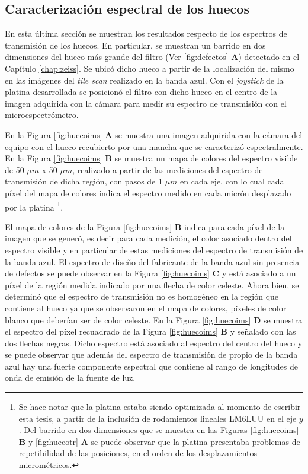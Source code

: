 \singlespacing
\subsection{Caracterización espectral de los huecos}
\label{sec:defctag}

\hspace{0.5cm}En esta última sección se muestran los resultados respecto de los espectros de transmisión de los huecos. En particular, se muestran un barrido en dos dimensiones del hueco más grande del filtro (Ver \ref{fig:defectos} \textbf{A}) detectado en el Capítulo \ref{chap:zeiss}. Se ubicó dicho hueco a partir de la localización del mismo en las imágenes del \textit{tile scan} realizado en la banda azul. Con el \textit{joystick} de la platina desarrollada se posicionó el filtro con dicho hueco en el centro de la imagen adquirida con la cámara para medir su espectro de transmisión con el microespectrómetro.

En la Figura \ref{fig:huecoims} \textbf{A} se muestra una imagen adquirida con la cámara del equipo con el hueco recubierto por una mancha que se caracterizó espectralmente. En la Figura \ref{fig:huecoims} \textbf{B} se muestra un mapa de colores del espectro visible de 50 $\mu m$ x 50 $\mu m$, realizado a partir de las mediciones del espectro de transmisión de dicha región, con pasos de 1 $\mu m$ en cada eje, con lo cual cada píxel del mapa de colores indica el espectro medido en cada micrón desplazado por la platina \footnote{Se hace notar que la platina estaba siendo optimizada al momento de escribir esta tesis, a partir de la inclusión de rodamientos lineales LM6LUU en el eje \textit{$y$}. Del barrido en dos dimensiones que se muestra en las Figuras \ref{fig:huecoims} \textbf{B} y \ref{fig:huecotr} \textbf{A} se puede observar que la platina presentaba problemas de repetibilidad de las posiciones, en el orden de los desplazamientos micrométricos.}. 

El mapa de colores de la Figura \ref{fig:huecoims} \textbf{B} indica para cada píxel de la imagen que se generó, es decir para cada medición, el color asociado dentro del espectro visible y en particular de estas mediciones del espectro de transmisión de la banda azul. El espectro de diseño del fabricante de la banda azul sin presencia de defectos se puede observar en la Figura \ref{fig:huecoims} \textbf{C} y está asociado a un píxel de la región medida indicado por una flecha de color celeste. Ahora bien, se determinó que el espectro de transmisión no es homogéneo en la región que contiene al hueco ya que se observaron en el mapa de colores, píxeles de color blanco que deberían ser de color celeste. En la Figura \ref{fig:huecoims} \textbf{D} se muestra el espectro del píxel recuadrado de la Figura \ref{fig:huecoims} \textbf{B} y señalado con las dos flechas negras. Dicho espectro está asociado al espectro del centro del hueco y se puede observar que además del espectro de transmisión de propio de la banda azul hay una fuerte componente espectral que contiene al rango de longitudes de onda de emisión de la fuente de luz.

